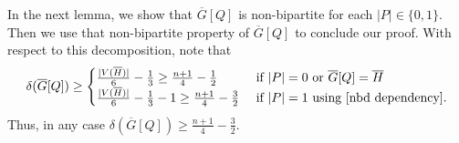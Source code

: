 \documentclass[reqno,10pt]{amsart}
\theoremstyle{definition}
\begin{document}
\noindent In the next lemma, we show that $\overline{G}[Q]$ is non-bipartite for each $|P|\in \{0,1\}$. Then we use that non-bipartite property of $\overline{G}[Q]$ to conclude our proof. With respect to this decomposition, note that 
\begin{equation*}
\delta(\overline{G}[Q])\geq\begin{cases}
\frac{|V(\overline{H})|}{6}-\frac{1}{3}\geq \frac{n+1}{4}-\frac{1}{2}&\text{ if } |P|=0\text{ or }\overline{G}[Q]=\overline{H}\\
\frac{|V(\overline{H})|}{6}-\frac{1}{3}-1\geq \frac{n+1}{4}-\frac{3}{2} &\text{ if } |P|=1\text{ using }\eqref{nbd dependency}.
\end{cases}   
\end{equation*}
Thus, in any case $\delta(\overline{G}[Q])\geq\frac{n+1}{4}-\frac{3}{2}$.
\end{document}
